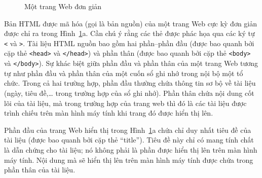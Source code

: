 \begin{figure} 
  \centering {}
  \caption{Một trang Web đơn giản}
  \label{fig:fig4.9}
\end{figure}

Bản HTML được mã hóa (gọi là bản nguồn) của một trang Web cực kỳ đơn giản được chỉ ra
trong Hình~\ref{fig:fig4.9}a. Cần chú ý rằng các thẻ được phác họa qua các ký tự
\texttt{<} và \texttt{>}.  Tài liệu HTML nguồn bao gồm hai phần--phần đầu (được bao quanh
bởi cặp thẻ \texttt{<head>} và \texttt{</head>}) và phần thân (được bao quanh bởi cặp thẻ
\texttt{<body>} và \texttt{</body>}). Sự khác biệt giữa phần đầu và phần thân của một
trang Web tương tự như phần đầu và phần thân của một cuốn sổ ghi nhớ trong nội bộ một tổ
chức. Trong cả hai trường hợp, phần đầu thường chứa thông tin sơ bộ về tài liệu (ngày,
tiêu đề,… trong trường hợp của sổ ghi nhớ). Phần thân chứa nội dung cốt lõi của tài liệu,
mà trong trường hợp của trang web thì đó là các tài liệu được trình chiếu trên màn hình
máy tính khi trang đó được hiển thị lên.

Phần đầu của trang Web hiển thị trong Hình~\ref{fig:fig4.9}a chứa chỉ duy nhất tiêu đề của
tài liệu (được bao quanh bởi cặp thẻ ``title''). Tiêu đề này chỉ có mang tính chất là dẫn
chứng cho tài liệu; nó không phải là phần được hiển thị lên trên màn hình máy tính. Nội
dung mà sẽ hiển thị lên trên màn hình máy tính được chứa trong phần thân của tài liệu.


